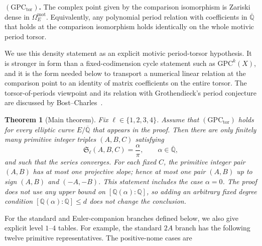 \documentclass[11pt,a4paper]{amsart} %
\newtheorem{theorem}{Theorem}[section]
\theoremstyle{definition}
\newcommand{\Q}{\mathbb Q}
\newcommand{\Qbar}{\overline{\mathbb Q}}
\begin{document}
\medskip
\noindent
\textbf{\((\mathrm{GPC}_{\mathrm{tor}})\).}
The complex point given by the comparison isomorphism is Zariski dense in \(\Omega^{\mathrm{mot}}_E\).
Equivalently, any polynomial period relation with coefficients in \(\Qbar\) that holds at the comparison isomorphism holds identically on the whole motivic period torsor.

\medskip

We use this density statement as an explicit motivic period-torsor hypothesis.  It is stronger in form than a fixed-codimension cycle statement such as $\mathrm{GPC}^k(X)$, and it is the form needed below to transport a numerical linear relation at the comparison point to an identity of matrix coefficients on the entire torsor.  The torsor-of-periods viewpoint and its relation with Grothendieck's period conjecture are discussed by Bost--Charles~\cite{BCC}.

\begin{theorem}[Main theorem]\label{thm:main}
Fix \(\ell\in\{1,2,3,4\}\).
Assume that \((\mathrm{GPC}_{\mathrm{tor}})\) holds for every elliptic curve \(E/\Qbar\) that appears in the proof.
Then there are only finitely many primitive integer triples \((A,B,C)\) satisfying
\[
{\mathfrak S}_\ell(A,B,C)=\frac{\alpha}{\pi},
\qquad \alpha\in\Qbar,
\]
and such that the series converges.
For each fixed \(C\), the primitive integer pair \((A,B)\) has at most one projective slope; hence at most one pair \((A,B)\) up to sign \((A,B)\) and \((-A,-B)\).
This statement includes the case \(\alpha=0\).
The proof does not use any upper bound on \([\Q(\alpha):\Q]\), so adding an arbitrary fixed degree condition \([\Q(\alpha):\Q]\le d\) does not change the conclusion.
\end{theorem}
For the standard and Euler-companion branches defined below, we also give
explicit level \(1\)--\(4\) tables. For example, the standard \(2A\) branch
has the following twelve primitive representatives. The positive-nome cases
are
\end{document}
